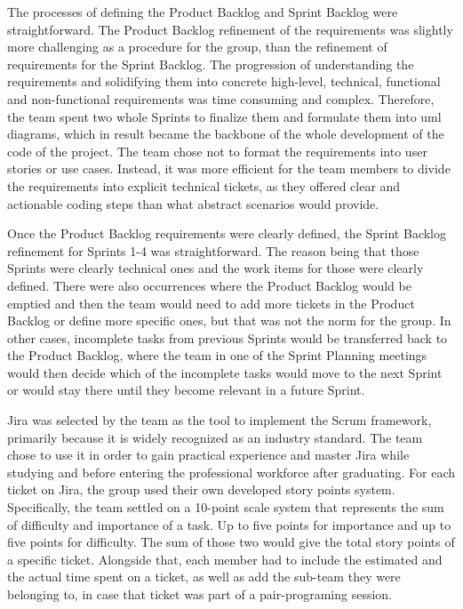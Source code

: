 The processes of defining the Product Backlog and Sprint Backlog were straightforward. 
The Product Backlog refinement of the requirements was slightly more challenging as a procedure for the group, than the refinement of requirements for the Sprint Backlog. 
The progression of understanding the requirements and solidifying them into concrete 
high-level, technical, functional and non-functional requirements was time consuming and complex. Therefore, the team spent two whole Sprints to finalize them and formulate them into \acrshort{uml} diagrams, which in result became the backbone of the whole development of the code of the project. 
The team chose not to format the requirements into user stories or use cases. Instead, it was more efficient for the team members to divide the requirements into explicit technical tickets, as they offered clear and actionable coding steps than what abstract scenarios would provide.

Once the Product Backlog requirements were clearly defined, the Sprint Backlog refinement for Sprints 1-4 was straightforward. 
The reason being that those Sprints were clearly technical ones and the work items for those were clearly defined. 
There were also occurrences where the Product Backlog would be emptied and then the team would need to add more tickets in the Product Backlog or define more specific ones, but that was not the norm for the group. In other cases, incomplete tasks from previous Sprints would be transferred back to the Product Backlog, where the team in one of the Sprint Planning meetings would then decide which of the incomplete tasks would move to the next Sprint or would stay there until they become relevant in a future Sprint.

Jira was selected by the team as the tool to implement the Scrum framework, primarily because it is widely recognized as an industry standard. The team chose to use it in order to gain practical experience and master Jira while studying and before entering the professional workforce after graduating.
For each ticket on Jira, the group used their own developed story points system. 
Specifically, the team settled on a 10-point scale system that represents the sum of difficulty and importance of a task. Up to five points for importance and up to five points for difficulty. The sum of those two would give the total story points of a specific ticket. 
Alongside that, each member had to include the estimated and the actual time spent on a ticket, 
as well as add the sub-team they were belonging to, in case that ticket was part of a pair-programing session.


